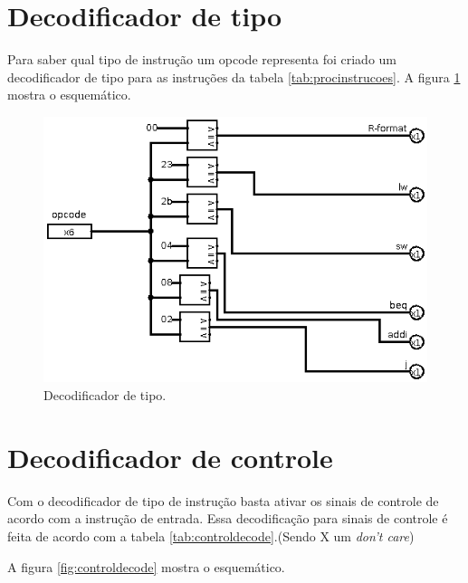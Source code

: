 \documentclass[12pt]{article}
\begin{document}
\section{Decodificador de tipo}
\label{sec:org3245176}

Para saber qual tipo de instrução um opcode representa foi criado um decodificador de tipo para as instruções da tabela \ref{tab:procinstrucoes}. A figura \ref{fig:typedecode} mostra o esquemático.

\begin{figure}[htbp]
\centering
\includegraphics[width=.9\linewidth]{./typedecode.png}
\caption{\label{fig:typedecode}
Decodificador de tipo.}
\end{figure}


\section{Decodificador de controle}
\label{sec:orgc337f61}

Com o decodificador de tipo de instrução basta ativar os sinais de controle de acordo com a instrução de entrada. Essa decodificação para sinais de controle é feita de acordo com a tabela \ref{tab:controldecode}.(Sendo X um \emph{don't care})

A figura \ref{fig:controldecode} mostra o esquemático.
\end{document}
